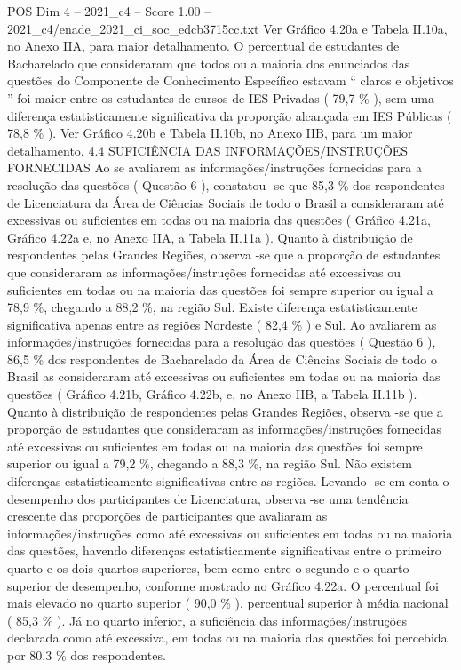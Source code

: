 \begin{textsample}{POS Dim 4 – 2021\_c4 – Score 1.00 – 2021\_c4/enade\_2021\_ci\_soc\_edcb3715cc.txt}
Ver Gráfico 4.20a e Tabela II.10a, no Anexo IIA, para maior detalhamento.
O percentual de estudantes de Bacharelado que consideraram que todos ou a maioria dos enunciados das questões do Componente de Conhecimento Específico estavam “ claros e objetivos ” foi maior entre os estudantes de cursos de IES Privadas ( 79,7 \% ), sem uma diferença estatisticamente significativa da proporção alcançada em IES Públicas ( 78,8 \% ).
Ver Gráfico 4.20b e Tabela II.10b, no Anexo IIB, para um maior detalhamento. 4.4 SUFICIÊNCIA DAS INFORMAÇÕES/INSTRUÇÕES FORNECIDAS Ao se avaliarem as informações/instruções fornecidas para a resolução das questões ( Questão 6 ), constatou -se que 85,3 \% dos respondentes de Licenciatura da Área de Ciências Sociais de todo o Brasil a consideraram até excessivas ou suficientes em todas ou na maioria das questões ( Gráfico 4.21a, Gráfico 4.22a e, no Anexo IIA, a Tabela II.11a ).
Quanto à distribuição de respondentes pelas Grandes Regiões, observa -se que a proporção de estudantes que consideraram as informações/instruções fornecidas até excessivas ou suficientes em todas ou na maioria das questões foi sempre superior ou igual a 78,9 \%, chegando a 88,2 \%, na região Sul.
Existe diferença estatisticamente significativa apenas entre as regiões Nordeste ( 82,4 \% ) e Sul.
Ao avaliarem as informações/instruções fornecidas para a resolução das questões ( Questão 6 ), 86,5 \% dos respondentes de Bacharelado da Área de Ciências Sociais de todo o Brasil as consideraram até excessivas ou suficientes em todas ou na maioria das questões ( Gráfico 4.21b, Gráfico 4.22b, e, no Anexo IIB, a Tabela II.11b ).
Quanto à distribuição de respondentes pelas Grandes Regiões, observa -se que a proporção de estudantes que consideraram as informações/instruções fornecidas até excessivas ou suficientes em todas ou na maioria das questões foi sempre superior ou igual a 79,2 \%, chegando a 88,3 \%, na região Sul.
Não existem diferenças estatisticamente significativas entre as regiões.
Levando -se em conta o desempenho dos participantes de Licenciatura, observa -se uma tendência crescente das proporções de participantes que avaliaram as informações/instruções como até excessivas ou suficientes em todas ou na maioria das questões, havendo diferenças estatisticamente significativas entre o primeiro quarto e os dois quartos superiores, bem como entre o segundo e o quarto superior de desempenho, conforme mostrado no Gráfico 4.22a.
O percentual foi mais elevado no quarto superior ( 90,0 \% ), percentual superior à média nacional ( 85,3 \% ).
Já no quarto inferior, a suficiência das informações/instruções declarada como até excessiva, em todas ou na maioria das questões foi percebida por 80,3 \% dos respondentes.

\end{textsample}
